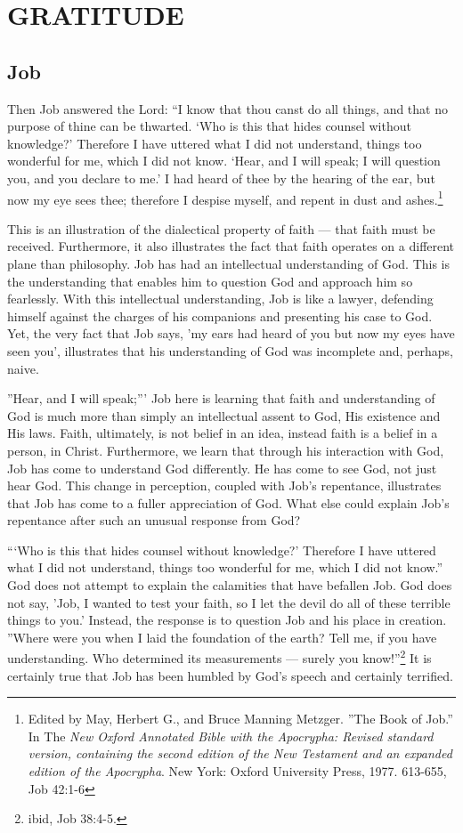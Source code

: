 \chapter{GRATITUDE}
	\section{Job}
Then Job answered the Lord: ``I know that thou canst do all things, and that no purpose of thine can be thwarted. `Who is this that hides counsel without knowledge?' Therefore I have uttered what I did not understand, things too wonderful for me, which I did not know. `Hear, and I will speak; I will question you, and you declare to me.' I had heard of thee by the hearing of the ear, but now my eye sees thee; therefore I despise myself, and repent in dust and ashes.\footnote{Edited by May, Herbert G., and Bruce Manning Metzger. ''The Book of Job.'' In The \emph{New Oxford Annotated Bible with the Apocrypha: Revised standard version, containing the second edition of the New Testament and an expanded edition of the Apocrypha}. New York: Oxford University Press, 1977. 613-655, Job 42:1-6} 


This is an illustration of the dialectical property of faith --- that faith must be received. Furthermore, it also illustrates the fact that faith operates on a different plane than philosophy. Job has had an intellectual understanding of God. This is the understanding that enables him to question God and approach him so fearlessly. With this intellectual understanding, Job is like a lawyer, defending himself against the charges of his companions and presenting his case to God. Yet, the very fact that Job says, 'my ears had heard of you but now my eyes have seen you', illustrates that his understanding of God was incomplete and, perhaps, naive.

''Hear, and I will speak;''' Job here is learning that faith and understanding of God is much more than simply an intellectual assent to God, His existence and His laws. Faith, ultimately, is not belief in an idea, instead faith is a belief in a person, in Christ. Furthermore, we learn that through his interaction with God, Job has come to understand God differently. He has come to see God, not just hear God. This change in perception, coupled with Job's repentance, illustrates that Job has come to a fuller appreciation of God. What else could explain Job's repentance after such an unusual response from God? 

```Who is this that hides counsel without knowledge?' Therefore I have uttered what I did not understand, things too wonderful for me, which I did not know.'' God does not attempt to explain the calamities that have befallen Job. God does not say, 'Job, I wanted to test your faith, so I let the devil do all of these terrible things to you.' Instead, the response is to question Job and his place in creation. ''Where were you when I laid the foundation of the earth? Tell me, if you have understanding. Who determined its measurements --- surely you know!''\footnote{ibid, Job 38:4-5.} It is certainly true that Job has been humbled by God's speech and certainly terrified. 

